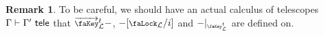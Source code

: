 \documentclass[10pt]{article} \usepackage{fullpage}
\theoremstyle{definition} \newtheorem{definition}[theorem]{Definition}
\newtheorem{remark}[theorem]{Remark}
\newcommand{\tele}{\,\,\mathsf{tele}}
\newcommand{\lock}{\mathchoice {\scalebox{0.8}{\text{\faLock}}}
  {\scalebox{0.8}{\text{\faLock}}} {\scalebox{0.5}{\text{\faLock}}}
  {\scalebox{0.4}{\text{\faLock}}} }
\newcommand{\varkey}[2]{\key_{\lockn{#1}}^{#2}}
\newcommand{\admkeye}[2]{\overrightarrow{\key}_{#1}^{#2}}
\newcommand{\locksub}[2]{\lock_{\lockn{#1}}/#2}
\begin{document}
\begin{remark}
  To be careful, we should have an actual calculus of telescopes
  $\Gamma \yields \Gamma' \tele$ that $\admkeye{\lockn{L}}{t} -$,
  $-[\locksub{L}{i}]$ and $-|_{\varkey{L}{t}}$ are defined on.
\end{remark}

\end{document}
